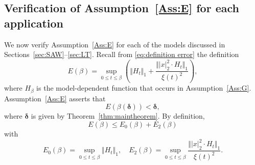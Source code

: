 \documentclass[11pt,a4paper]{article}
\numberwithin{equation}{section}
\theoremstyle{plain}
\theoremstyle{definition}
\newcommand\1{\mathds{1}}
\newcommand{\deltamain}{\boldsymbol{\delta}}
\begin{document}
\subsection{Verification of Assumption~\ref{Ass:E} for each application}
\label{sec:AssE}



We now verify Assumption~\ref{Ass:E} for
each of the models discussed in Sections~\ref{sec:SAW}--\ref{sec:LT}.
Recall from \eqref{eq:definition error} the definition
\begin{equation}
	E(\beta) =
    \sup_{0\leq t\leq \beta}\left(\Vert H_t \Vert_1 + \frac{\Vert |x|_2^2\cdot H_t \Vert_1}{\xi (t)^2}\right),
\end{equation}
where $H_\beta$ is the model-dependent function that occurs in
Assumption~\ref{Ass:G}.
Assumption~\ref{Ass:E} asserts that
\begin{equation}
\label{eq:AssEconc}
    E(\beta(\deltamain)) < \deltamain,
\end{equation}
where $\deltamain$ is given by Theorem~\ref{thm:maintheorem}.
By definition,
\begin{equation}
	E(\beta) \le E_0(\beta)+ E_2(\beta)
\end{equation}
with
\begin{equation}
\label{eq:Eapp}
     E_0(\beta)=
     \sup_{0\leq t\leq \beta} \Vert H_t \Vert_1
     , \quad
      E_2(\beta)=
     \sup_{0\leq t\leq \beta} \frac{\Vert |x|_2^2\cdot H_t \Vert_1}{\xi (t)^2}
    .
\end{equation}
\end{document}
